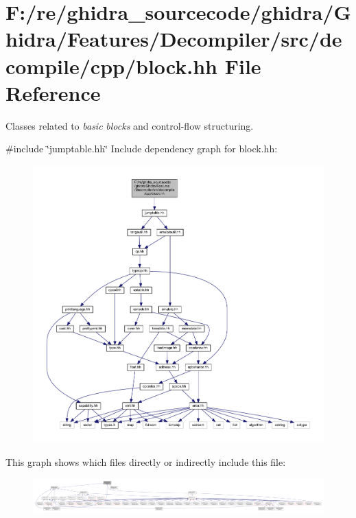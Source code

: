 \hypertarget{block_8hh}{}\section{F\+:/re/ghidra\+\_\+sourcecode/ghidra/\+Ghidra/\+Features/\+Decompiler/src/decompile/cpp/block.hh File Reference}
\label{block_8hh}


Classes related to {\itshape basic} {\itshape blocks} and control-\/flow structuring.  


{\ttfamily \#include \char`\"{}jumptable.\+hh\char`\"{}}\newline
Include dependency graph for block.\+hh\+:
\nopagebreak
\begin{figure}[H]
\begin{center}
\leavevmode
\includegraphics[width=350pt]{block_8hh__incl}
\end{center}
\end{figure}
This graph shows which files directly or indirectly include this file\+:
\nopagebreak
\begin{figure}[H]
\begin{center}
\leavevmode
\includegraphics[width=350pt]{block_8hh__dep__incl}
\end{center}
\end{figure}
